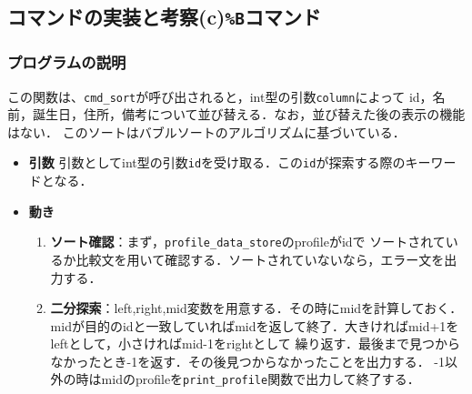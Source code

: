 \subsection{コマンドの実装と考察(c)\texttt{\%B}コマンド}

  \subsubsection{プログラムの説明}
  この関数は、\texttt{cmd\_sort}が呼び出されると，int型の引数\texttt{column}によって
  id，名前，誕生日，住所，備考について並び替える．なお，並び替えた後の表示の機能はない．
  このソートはバブルソートのアルゴリズムに基づいている．

      \begin{itemize}
        \item \textbf{引数} 引数としてint型の引数\texttt{id}を受け取る．この\texttt{id}が探索する際のキーワードとなる．
        \item \textbf{動き}
        \begin{enumerate}
          \item \textbf{ソート確認}：まず，\texttt{profile\_data\_store}のprofileがidで
          ソートされているか比較文を用いて確認する．ソートされていないなら，エラー文を出力する．
          \item \textbf{二分探索}：left,right,mid変数を用意する．その時にmidを計算しておく．
          midが目的のidと一致していればmidを返して終了．大きければmid+1をleftとして，小さければmid-1をrightとして
          繰り返す．最後まで見つからなかったとき-1を返す．その後見つからなかったことを出力する．
          -1以外の時はmidのprofileを\texttt{print\_profile}関数で出力して終了する．
        \end{enumerate}
      \end{itemize}
      

